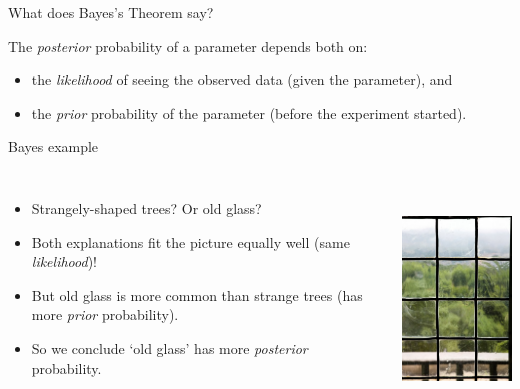\documentclass[usenames,dvipsnames]{beamer}
\begin{document}
\begin{frame}{What does Bayes's Theorem say?}
  \begin{block}{}
  The \textit{posterior} probability of a parameter depends both on:
    \begin{itemize}
      \item{the \textit{likelihood} of seeing the observed data (given the parameter), and}
      \item{the \textit{prior} probability of the parameter (before the experiment started).}
    \end{itemize}
  \end{block}
\end{frame}


\begin{frame}{Bayes example}
  \begin{columns}
    \begin{itemize}
      \item{Strangely-shaped trees? Or old glass?}
      \item{Both explanations fit the picture equally well (same \textit{likelihood})!}
      \item{But old glass is more common than strange trees (has more \textit{prior} probability).}
      \item{So we conclude `old glass' has more \textit{posterior} probability.}
    \end{itemize}
    \centering
    \includegraphics[height=6cm]{BDP1F0.jpg}
  \end{columns}
\end{frame}
\end{document}
